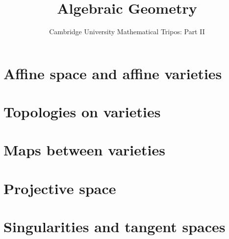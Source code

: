 \documentclass{article}
\title{Algebraic Geometry}
\author{Cambridge University Mathematical Tripos: Part II}
\begin{document}
\maketitle

\tableofcontentsnewpage{}


\section{Affine space and affine varieties}

\section{Topologies on varieties}

\section{Maps between varieties}

\section{Projective space}

\section{Singularities and tangent spaces}

\end{document}
